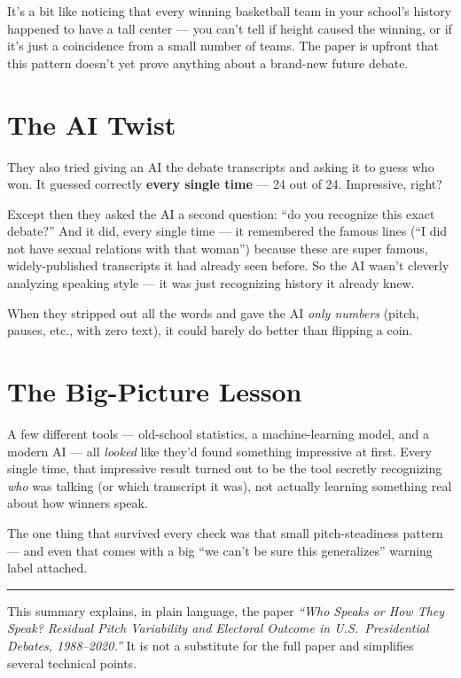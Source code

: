 \documentclass[11pt]{article}
\begin{document}
It's a bit like noticing that every winning basketball team in your
school's history happened to have a tall center --- you can't tell if
height caused the winning, or if it's just a coincidence from a small
number of teams. The paper is upfront that this pattern doesn't yet prove
anything about a brand-new future debate.

\section*{The AI Twist}
They also tried giving an AI the debate transcripts and asking it to
guess who won. It guessed correctly \textbf{every single time} --- 24 out
of 24. Impressive, right?

Except then they asked the AI a second question: ``do you recognize this
exact debate?'' And it did, every single time --- it remembered the famous
lines (``I did not have sexual relations with that woman'') because these
are super famous, widely-published transcripts it had already seen
before. So the AI wasn't cleverly analyzing speaking style --- it was
just recognizing history it already knew.

When they stripped out all the words and gave the AI \emph{only numbers}
(pitch, pauses, etc., with zero text), it could barely do better than
flipping a coin.

\section*{The Big-Picture Lesson}
A few different tools --- old-school statistics, a machine-learning
model, and a modern AI --- all \emph{looked} like they'd found something
impressive at first. Every single time, that impressive result turned out
to be the tool secretly recognizing \emph{who} was talking (or which
transcript it was), not actually learning something real about how
winners speak.

The one thing that survived every check was that small pitch-steadiness
pattern --- and even that comes with a big ``we can't be sure this
generalizes'' warning label attached.

\vspace{1.5em}
\noindent\rule{\linewidth}{0.5pt}
\vspace{0.5em}

{\small\color{sec} This summary explains, in plain language, the paper
\emph{``Who Speaks or How They Speak? Residual Pitch Variability and
Electoral Outcome in U.S.\ Presidential Debates, 1988--2020.''} It is not
a substitute for the full paper and simplifies several technical points.}
\end{document}
